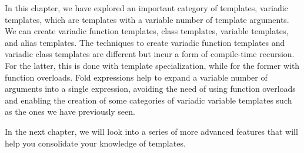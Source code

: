 In this chapter, we have explored an important category of templates, variadic templates, which are templates with a variable number of template arguments. We can create variadic function templates, class templates, variable templates, and alias templates. The techniques to create variadic function templates and variadic class templates are different but incur a form of compile-time recursion. For the latter, this is done with template specialization, while for the former with function overloads. Fold expressions help to expand a variable number of arguments into a single expression, avoiding the need of using function overloads and enabling the creation of some categories of variadic variable templates such as the ones we have previously seen.

In the next chapter, we will look into a series of more advanced features that will help you consolidate your knowledge of templates.